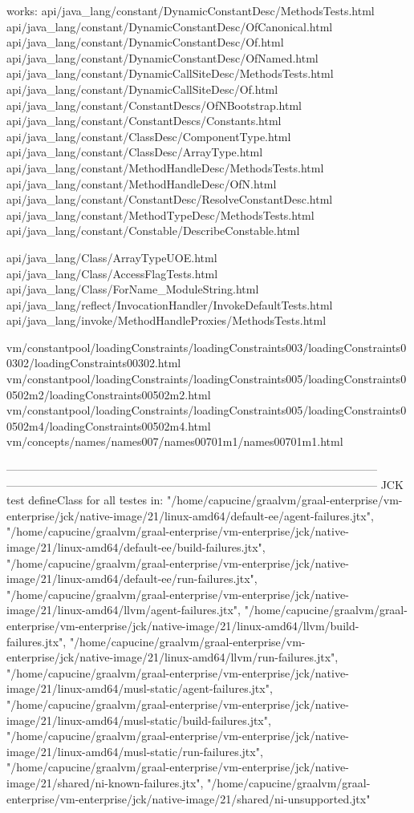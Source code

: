 works:
api/java_lang/constant/DynamicConstantDesc/MethodsTests.html
api/java_lang/constant/DynamicConstantDesc/OfCanonical.html
api/java_lang/constant/DynamicConstantDesc/Of.html
api/java_lang/constant/DynamicConstantDesc/OfNamed.html
api/java_lang/constant/DynamicCallSiteDesc/MethodsTests.html
api/java_lang/constant/DynamicCallSiteDesc/Of.html
api/java_lang/constant/ConstantDescs/OfNBootstrap.html
api/java_lang/constant/ConstantDescs/Constants.html
api/java_lang/constant/ClassDesc/ComponentType.html
api/java_lang/constant/ClassDesc/ArrayType.html
api/java_lang/constant/MethodHandleDesc/MethodsTests.html
api/java_lang/constant/MethodHandleDesc/OfN.html
api/java_lang/constant/ConstantDesc/ResolveConstantDesc.html
api/java_lang/constant/MethodTypeDesc/MethodsTests.html
api/java_lang/constant/Constable/DescribeConstable.html

api/java_lang/Class/ArrayTypeUOE.html
api/java_lang/Class/AccessFlagTests.html
api/java_lang/Class/ForName_ModuleString.html
api/java_lang/reflect/InvocationHandler/InvokeDefaultTests.html
api/java_lang/invoke/MethodHandleProxies/MethodsTests.html

vm/constantpool/loadingConstraints/loadingConstraints003/loadingConstraints00302/loadingConstraints00302.html
vm/constantpool/loadingConstraints/loadingConstraints005/loadingConstraints00502m2/loadingConstraints00502m2.html
vm/constantpool/loadingConstraints/loadingConstraints005/loadingConstraints00502m4/loadingConstraints00502m4.html
vm/concepts/names/names007/names00701m1/names00701m1.html

---------------------------------------------------------------------------------------------------
---------------------------------------------------------------------------------------------------
JCK test defineClass for all testes in:
        "/home/capucine/graalvm/graal-enterprise/vm-enterprise/jck/native-image/21/linux-amd64/default-ee/agent-failures.jtx",
        "/home/capucine/graalvm/graal-enterprise/vm-enterprise/jck/native-image/21/linux-amd64/default-ee/build-failures.jtx",
        "/home/capucine/graalvm/graal-enterprise/vm-enterprise/jck/native-image/21/linux-amd64/default-ee/run-failures.jtx",
        "/home/capucine/graalvm/graal-enterprise/vm-enterprise/jck/native-image/21/linux-amd64/llvm/agent-failures.jtx",
        "/home/capucine/graalvm/graal-enterprise/vm-enterprise/jck/native-image/21/linux-amd64/llvm/build-failures.jtx",
        "/home/capucine/graalvm/graal-enterprise/vm-enterprise/jck/native-image/21/linux-amd64/llvm/run-failures.jtx",
        "/home/capucine/graalvm/graal-enterprise/vm-enterprise/jck/native-image/21/linux-amd64/musl-static/agent-failures.jtx",
        "/home/capucine/graalvm/graal-enterprise/vm-enterprise/jck/native-image/21/linux-amd64/musl-static/build-failures.jtx",
        "/home/capucine/graalvm/graal-enterprise/vm-enterprise/jck/native-image/21/linux-amd64/musl-static/run-failures.jtx",
        "/home/capucine/graalvm/graal-enterprise/vm-enterprise/jck/native-image/21/shared/ni-known-failures.jtx",
        "/home/capucine/graalvm/graal-enterprise/vm-enterprise/jck/native-image/21/shared/ni-unsupported.jtx"
        

